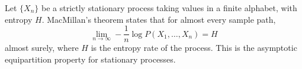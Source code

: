 Let $\{X_n\}$ be a strictly stationary process taking values in a finite alphabet, with entropy $H$. MacMillan's theorem states that for almost every sample path,
$$\lim_{n \to \infty} -\frac{1}{n} \log P(X_1, \ldots, X_n) = H$$
almost surely, where $H$ is the entropy rate of the process. This is the asymptotic equipartition property for stationary processes.
